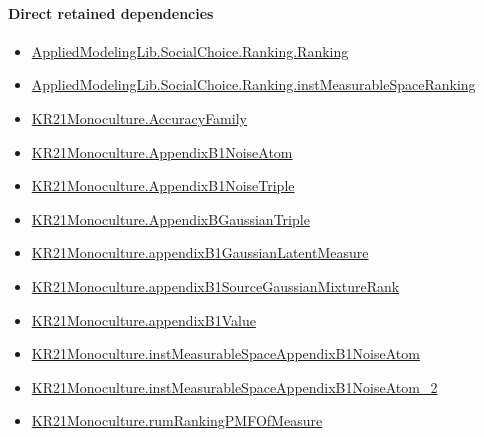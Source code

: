 \documentclass[10pt]{article}
\begin{document}
\paragraph{Direct retained dependencies}
\begin{itemize}\raggedright
\item \hyperlink{library-prerequisite-5cde54446d1ae021}{Applied\allowbreak{}Modeling\allowbreak{}Lib.\allowbreak{}Social\allowbreak{}Choice.\allowbreak{}Ranking.\allowbreak{}Ranking}
\item \hyperlink{governing-declaration-30ca9c740ef703ec}{Applied\allowbreak{}Modeling\allowbreak{}Lib.\allowbreak{}Social\allowbreak{}Choice.\allowbreak{}Ranking.\allowbreak{}inst\allowbreak{}Measurable\allowbreak{}Space\allowbreak{}Ranking}
\item \hyperlink{paper-prerequisite-a1353b2b1b6f0303}{KR21\allowbreak{}Monoculture.\allowbreak{}Accuracy\allowbreak{}Family}
\item \hyperlink{governing-declaration-792cef0e45be0c6d}{KR21\allowbreak{}Monoculture.\allowbreak{}Appendix\allowbreak{}B1\allowbreak{}Noise\allowbreak{}Atom}
\item \hyperlink{governing-declaration-772881b315f3e73e}{KR21\allowbreak{}Monoculture.\allowbreak{}Appendix\allowbreak{}B1\allowbreak{}Noise\allowbreak{}Triple}
\item \hyperlink{governing-declaration-4ebcacb6f266705a}{KR21\allowbreak{}Monoculture.\allowbreak{}Appendix\allowbreak{}B\allowbreak{}Gaussian\allowbreak{}Triple}
\item \hyperlink{governing-declaration-0bab8a9a9619ec52}{KR21\allowbreak{}Monoculture.\allowbreak{}appendix\allowbreak{}B1\allowbreak{}Gaussian\allowbreak{}Latent\allowbreak{}Measure}
\item \hyperlink{governing-declaration-4b368d0711b5f635}{KR21\allowbreak{}Monoculture.\allowbreak{}appendix\allowbreak{}B1\allowbreak{}Source\allowbreak{}Gaussian\allowbreak{}Mixture\allowbreak{}Rank}
\item \hyperlink{governing-declaration-c2461f284c18c0e0}{KR21\allowbreak{}Monoculture.\allowbreak{}appendix\allowbreak{}B1\allowbreak{}Value}
\item \hyperlink{governing-declaration-1aba67b6faabf336}{KR21\allowbreak{}Monoculture.\allowbreak{}inst\allowbreak{}Measurable\allowbreak{}Space\allowbreak{}Appendix\allowbreak{}B1\allowbreak{}Noise\allowbreak{}Atom}
\item \hyperlink{governing-declaration-0e5e99abc0d2bb6e}{KR21\allowbreak{}Monoculture.\allowbreak{}inst\allowbreak{}Measurable\allowbreak{}Space\allowbreak{}Appendix\allowbreak{}B1\allowbreak{}Noise\allowbreak{}Atom\_\allowbreak{}2}
\item \hyperlink{governing-declaration-ba11126c32f3deba}{KR21\allowbreak{}Monoculture.\allowbreak{}rum\allowbreak{}Ranking\allowbreak{}PMF\allowbreak{}Of\allowbreak{}Measure}
\end{itemize}
\hypertarget{governing-declaration-a58e9f1ca8d07877}{}
\end{document}
